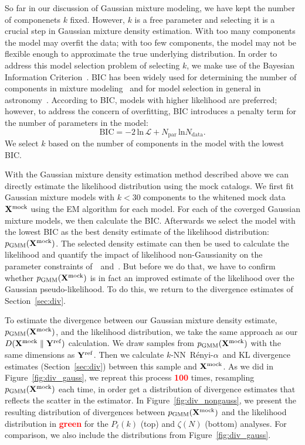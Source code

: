 \documentclass[12pt, letterpaper, preprint]{aastex}
\newcommand{\beq}{\begin{equation}}
\newcommand{\eeq}{\end{equation}}
\newcommand{\todo}[1]{{\bf \textcolor{red}{#1}}}
\newcommand{\Xmock}{{\bf X}^\mathrm{mock}}
\newcommand{\Yref}{{\bf Y}^\mathrm{ref}}
\newcommand{\Ralpha}{R\'enyi-$\alpha$}
\newcommand{\Beut}{\citetalias{beutler2017}}
\newcommand{\Sinh}{\citetalias{sinha2017a}}
\begin{document}
So far in our discussion of Gaussian mixture modeling, we have kept
the number of componenets $k$ fixed. However, $k$ is a free 
parameter and selecting it is a crucial step in Gaussian mixture
density estimation. With too many components the model may overfit 
the data; with too few components, 
the model may not be flexible enough to approximate the true 
underlying distribution. In order to address this model selection problem
of selecting $k$, we make use of the Bayesian Information 
Criterion~\citep[BIC;][]{schwarz1978}. BIC has been widely used for 
determining the number of components in mixture 
modeling~\citep{leroux1992,roeder1997,fraley1998,steele2010performance}
and for model selection in general in 
astronomy~\citep[\emph{e.g.}][]{liddle2007,broderick2011,wilkinson2015,vakili2016}.
According to BIC, models with higher likelihood are preferred; however, 
to address the concern of overfitting, BIC introduces a penalty term 
for the number of parameters in the model: 
\beq \label{eq:bic}
\mathrm{BIC} = -2\,\mathrm{ln}\,\mathcal{L} + N_\mathrm{par}\,\mathrm{ln}N_\mathrm{data}.
\eeq
We select $k$ based on the number of components in the model with the 
lowest BIC. 

With the Gaussian mixture density estimation method described above
we can directly estimate the likelihood distribution using the mock catalogs. 
We first fit Gaussian mixture models with $k < 30$ components to the whitened 
mock data $\Xmock$ using the EM algorithm for each model. For each of the 
coverged Gaussian mixture models, we then calculate the BIC. Afterwards we select 
the model with the lowest BIC as the best density estimate of the likelihood 
distribution: $p_\mathrm{\tiny GMM}(\Xmock)$. The selected density estimate can 
then be used to calculate the
likelihood and quantify the impact of likelihood non-Gaussianity on the 
parameter constraints of~\Beut~and~\Sinh. But before we do that, we have to 
confirm whether $p_\mathrm{\tiny GMM}(\Xmock)$ is in fact an improved estimate 
of the likelihood over the Gaussian pseudo-likelihood. To do this, we return 
to the divergence estimates of Section~\ref{sec:div}. 

To estimate the divergence between our Gaussian mixture density estimate,
$p_\mathrm{\tiny GMM}(\Xmock)$, and the likelihood distribution, we take 
the same approach as our $D(\Xmock \parallel \Yref)$ calculation. We draw samples from 
$p_\mathrm{\tiny GMM}(\Xmock)$ with the same dimensions as $\Yref$. 
Then we calculate $k$-NN~\Ralpha~and KL divergence estimates (Section~\ref{sec:div}) 
between this sample and $\Xmock$. As we did in Figure~\ref{fig:div_gauss}, 
we repreat this process \todo{100} times, resampling $p_\mathrm{\tiny GMM}(\Xmock)$
each time, in order get a distribution of divergence estimates that 
reflects the scatter in the estimator. In Figure~\ref{fig:div_nongauss}, 
we present the resulting distribution of divergences between 
$p_\mathrm{\tiny GMM}(\Xmock)$ and the likelihood distribution in \todo{green} 
for the $P_\ell(k)$ (top) and $\zeta(N)$ (bottom) analyses. For comparison, 
we also include the distributions from Figure~\ref{fig:div_gauss}. 
\end{document}
